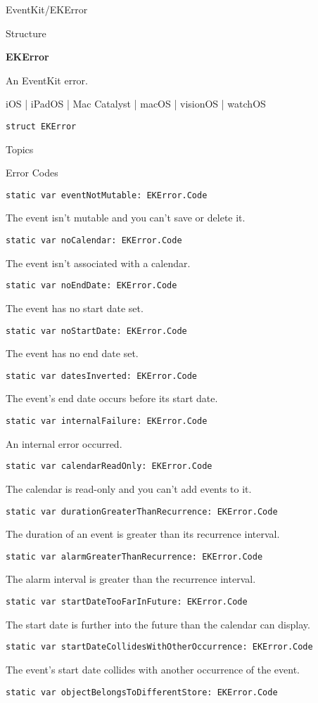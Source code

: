 \documentclass{article}
\title{}
\author{}
\date{}
\begin{document}
EventKit/EKError

Structure

\textbf{EKError}

An EventKit error.

iOS | iPadOS | Mac Catalyst | macOS | visionOS | watchOS

\texttt{struct EKError}

Topics

Error Codes

\texttt{static var eventNotMutable: EKError.Code}

The event isn't mutable and you can't save or delete it.

\texttt{static var noCalendar: EKError.Code}

The event isn't associated with a calendar.

\texttt{static var noEndDate: EKError.Code}

The event has no start date set.

\texttt{static var noStartDate: EKError.Code}

The event has no end date set.

\texttt{static var datesInverted: EKError.Code}

The event's end date occurs before its start date.

\texttt{static var internalFailure: EKError.Code}

An internal error occurred.

\texttt{static var calendarReadOnly: EKError.Code}

The calendar is read-only and you can't add events to it.

\texttt{static var durationGreaterThanRecurrence: EKError.Code}

The duration of an event is greater than its recurrence interval.

\texttt{static var alarmGreaterThanRecurrence: EKError.Code}

The alarm interval is greater than the recurrence interval.

\texttt{static var startDateTooFarInFuture: EKError.Code}

The start date is further into the future than the calendar can display.

\texttt{static var startDateCollidesWithOtherOccurrence: EKError.Code}

The event's start date collides with another occurrence of the event.

\texttt{static var objectBelongsToDifferentStore: EKError.Code}
\end{document}
